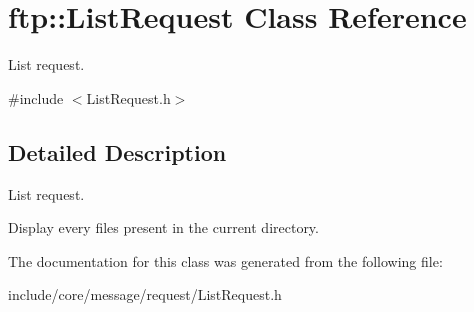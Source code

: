 \hypertarget{classftp_1_1_list_request}{\section{ftp\-:\-:List\-Request Class Reference}
\label{classftp_1_1_list_request}
}


List request.  




{\ttfamily \#include $<$List\-Request.\-h$>$}



\subsection{Detailed Description}
List request. 

Display every files present in the current directory. 

The documentation for this class was generated from the following file\-:\begin{DoxyCompactItemize}
\item 
include/core/message/request/List\-Request.\-h\end{DoxyCompactItemize}

